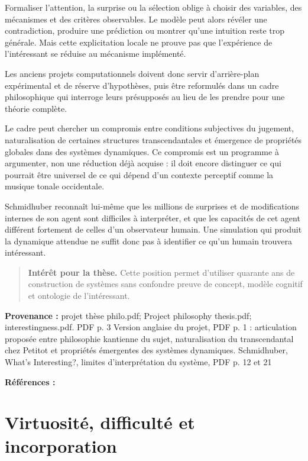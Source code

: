 \documentclass[10pt,a4paper]{article}
\begin{document}
Formaliser l'attention, la surprise ou la sélection oblige à choisir des variables, des mécanismes et des critères observables. Le modèle peut alors révéler une contradiction, produire une prédiction ou montrer qu'une intuition reste trop générale. Mais cette explicitation locale ne prouve pas que l'expérience de l'intéressant se réduise au mécanisme implémenté.

Les anciens projets computationnels doivent donc servir d'arrière-plan expérimental et de réserve d'hypothèses, puis être reformulés dans un cadre philosophique qui interroge leurs présupposés au lieu de les prendre pour une théorie complète.

Le cadre peut chercher un compromis entre conditions subjectives du jugement, naturalisation de certaines structures transcendantales et émergence de propriétés globales dans des systèmes dynamiques. Ce compromis est un programme à argumenter, non une réduction déjà acquise : il doit encore distinguer ce qui pourrait être universel de ce qui dépend d'un contexte perceptif comme la musique tonale occidentale.

Schmidhuber reconnaît lui-même que les millions de surprises et de modifications internes de son agent sont difficiles à interpréter, et que les capacités de cet agent différent fortement de celles d'un observateur humain. Une simulation qui produit la dynamique attendue ne suffit donc pas à identifier ce qu'un humain trouvera intéressant.

\begin{quote}
\textbf{Intérêt pour la thèse.} Cette position permet d'utiliser quarante ans de construction de systèmes sans confondre preuve de concept, modèle cognitif et ontologie de l'intéressant.
\end{quote}
{\footnotesize\color{metadata}\textbf{Provenance :} projet thèse philo.pdf; Project philosophy thesis.pdf; interestingness.pdf. PDF p. 3 Version anglaise du projet, PDF p. 1 : articulation proposée entre philosophie kantienne du sujet, naturalisation du transcendantal chez Petitot et propriétés émergentes des systèmes dynamiques. Schmidhuber, What's Interesting?, limites d'interprétation du système, PDF p. 12 et 21\par}
{\footnotesize\color{metadata}\textbf{Références :} \parencite{schmidhuber1997interesting,petitot1993phenomenologie,petitot2002naturaliser}\par}

\section{Virtuosité, difficulté et incorporation}
\end{document}
